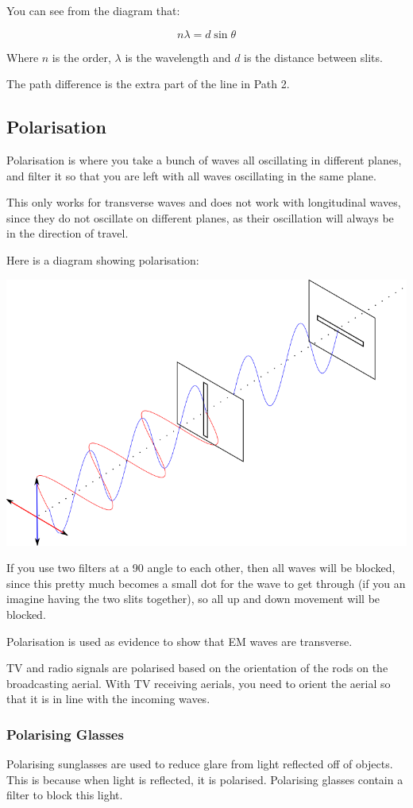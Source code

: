 \documentclass[a4paper, 12pt]{article}
\begin{document}
You can see from the diagram that:

$$
n\lambda = d\sin\theta
$$

Where $n$ is the order, $\lambda$ is the wavelength and $d$ is the distance between slits.

The path difference is the extra part of the line in Path 2.

\subsection{Polarisation}

Polarisation is where you take a bunch of waves all oscillating in different planes, and filter it so that you are left with all waves oscillating in the same plane.

This only works for transverse waves and does not work with longitudinal waves, since they do not oscillate on different planes, as their oscillation will always be in the direction of travel.

Here is a diagram showing polarisation:

\begin{center}
\includegraphics[width=\textwidth]{images/polarisation.png}
\end{center}

If you use two filters at a 90{\textdegree} angle to each other, then all waves will be blocked, since this pretty much becomes a small dot for the wave to get through (if you an imagine having the two slits together), so all up and down movement will be blocked.

Polarisation is used as evidence to show that EM waves are transverse.

TV and radio signals are polarised based on the orientation of the rods on the broadcasting aerial. With TV receiving aerials, you need to orient the aerial so that it is in line with the incoming waves.

\subsubsection{Polarising Glasses}

Polarising sunglasses are used to reduce glare from light reflected off of objects. This is because when light is reflected, it is polarised. Polarising glasses contain a filter to block this light.
\end{document}
